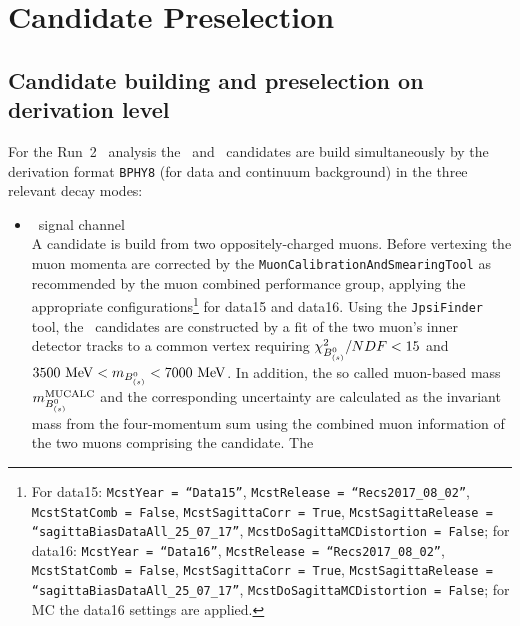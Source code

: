 \section{Candidate Preselection}
\label{sec:Preselection}

\subsection{Candidate building and preselection on derivation level}
\label{ssec:CandidateBuildingByDerivation}

For the Run~2 \Bmumu\ analysis the \Bds\ and \Jpsi\ candidates are build
simultaneously by the derivation format \texttt{BPHY8} (for data and continuum
background) in the three relevant decay modes:
\begin{itemize}
\item \Bmumu\ signal channel\\
  A \Bds candidate is build from two oppositely-charged muons.  
  Before vertexing the muon momenta are corrected by the 
  \texttt{MuonCalibrationAndSmearingTool} as
  recommended by the muon combined performance group, applying the 
  appropriate configurations\footnote{
    For data15: 
    \texttt{McstYear = ``Data15''}, 
    \texttt{McstRelease = ``Recs2017\_08\_02''},
    \texttt{McstStatComb = False},
    \texttt{McstSagittaCorr = True},
    \texttt{McstSagittaRelease = ``sagittaBiasDataAll\_25\_07\_17''},
    \texttt{McstDoSagittaMCDistortion = False};\newline
    for data16:
    \texttt{McstYear = ``Data16''}, 
    \texttt{McstRelease = ``Recs2017\_08\_02''},
    \texttt{McstStatComb = False},
    \texttt{McstSagittaCorr = True},
    \texttt{McstSagittaRelease = ``sagittaBiasDataAll\_25\_07\_17''},
    \texttt{McstDoSagittaMCDistortion = False};\newline
    for MC the data16 settings are applied.
  }
  for data15 and data16.
  Using the \texttt{JpsiFinder} tool, the \Bds\ candidates are 
  constructed by a fit of the two muon's inner detector tracks to a
  common vertex requiring $\chi^2_{B_{(s)}^0}/NDF < 15$ and $3500~\mathrm{MeV} 
  < m_{B_{(s)}^0} < 7000~\mathrm{MeV}$.  In addition, the so called
  muon-based mass $m^{\mathrm{MUCALC}}_{B_{(s)}^0}$ and the corresponding 
  uncertainty are calculated as the invariant
  mass from the four-momentum sum using the combined muon
  information of the two muons comprising the candidate.  The

\end{itemize}

